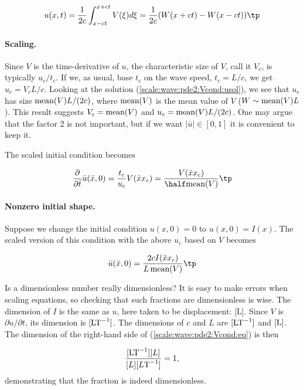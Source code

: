 \documentclass[graybox,envcountchap,sectrefs,final]{svmonodo}
\newenvironment{notice_mdfboxadmon}[1][]{
\begin{notice_mdfboxmdframed}[frametitle=#1]
}
{
\end{notice_mdfboxmdframed}
}
\begin{document}
\begin{equation}
u(x,t) = \frac{1}{2c}\int_{x-ct}^{x+ct} V(\xi) d\xi
 = \frac{1}{2c}(W(x+ct) - W(x-ct))\tp
 \label{scale:wave:pde2:Vcond:usol}
 \end{equation}

\paragraph{Scaling.}
Since $V$ is the time-derivative of $u$, the characteristic size of
$V$, call it $V_c$, is typically $u_c/t_c$.  If we, as usual, base
$t_c$ on the wave speed, $t_c = L/c$, we get $u_c = V_cL/c$.  Looking
at the solution (\ref{scale:wave:pde2:Vcond:usol}), we see that $u_c$
has size $\hbox{mean}(V)L/(2c)$, where $\hbox{mean}(V)$ is the mean
value of $V$ ($W\sim\hbox{mean}(V)L$). This result suggests
$V_c=\hbox{mean}(V)$ and $u_c = \hbox{mean}(V)L/(2c)$. One may argue
that the factor 2 is not important, but if we want $|\bar u|\in [0,1]$
it is convenient to keep it.

The scaled initial condition becomes

\[ \frac{\partial}{\partial \bar t} \bar u(\bar x,0) =
\frac{t_c}{u_c}V(\bar x x_c) =
\frac{V(\bar x x_c)}{\half\hbox{mean}(V)}\tp
\]


\paragraph{Nonzero initial shape.}
Suppose we change the initial condition $u(x,0)=0$ to $u(x,0)=I(x)$.
The scaled version of this condition with the above $u_c$
based on $V$ becomes

\begin{equation}
\bar u(\bar x, 0) = \frac{2cI(\bar x x_c)}{L\,\hbox{mean}(V)}\tp
\label{scale:wave:pde2:Vcond:eq}
\end{equation}


\begin{notice_mdfboxadmon}
Is a dimensionless number really dimensionless?
It is easy to make errors when scaling equations, so checking that
such fractions are dimensionless is wise.
The dimension of $I$ is the same as $u$, here taken to be displacement:
[L].
Since $V$ is $\partial u/\partial t$, its dimension is
$[\hbox{LT}^{-1}]$. The dimensions of $c$ and $L$ are
$[\hbox{LT}^{-1}]$ and $[\hbox{L}]$. The dimension of the right-hand side
of (\ref{scale:wave:pde2:Vcond:eq}) is then

\[ \frac{[\hbox{LT}^{-1}][L]}{[L][L\hbox{T}^{-1}]}
= 1,\]
demonstrating that the fraction is indeed dimensionless.
\end{notice_mdfboxadmon}
\end{document}
